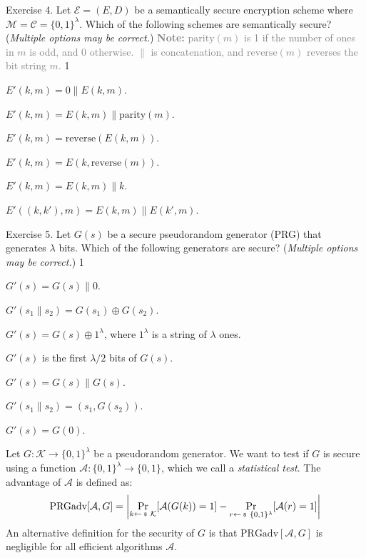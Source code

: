 \documentclass[../lecture-notes-148x210.tex]{subfiles}
\begin{document}
\begin{xexercise}
    {Exercise 4.}
    {Let $\mathcal{E} = (E,D)$ be a semantically secure encryption scheme where $\mathcal{M}=\mathcal{C}=\{0,1\}^{\lambda}$. Which of the following schemes are semantically secure? (\textit{Multiple options may be correct.})
    \newline
    \textcolor{gray}{\textbf{Note:} $\text{parity}(m)$ is 1 if the number of ones in $m$ is odd, and 0 otherwise. $\parallel$ is concatenation, and $\text{reverse}(m)$ reverses the bit string $m$.}}
    {1}
    {
        \item $E'(k,m) = 0 \parallel E(k,m)$.
        \item $E'(k,m)=E(k,m) \parallel \text{parity}(m)$.
        \item $E'(k,m)=\text{reverse}(E(k,m))$.
        \item $E'(k,m)=E(k,\text{reverse}(m))$.
        \item $E'(k,m) = E(k,m) \parallel k$.
        \item $E'((k,k'),m) = E(k,m) \parallel E(k',m)$.
    }
\end{xexercise}

\begin{xexercise}
    {Exercise 5.}
    {Let $G(s)$ be a secure pseudorandom generator (PRG) that generates $\lambda$ bits. Which of the following generators are secure? (\textit{Multiple options may be correct.})}
    {1}
    {
        \item $G'(s) = G(s) \parallel 0$.
        \item $G'(s_1 \parallel s_2) = G(s_1) \oplus G(s_2)$.
        \item $G'(s) = G(s) \oplus 1^{\lambda}$, where $1^{\lambda}$ is a string of $\lambda$ ones.
        \item $G'(s)$ is the first $\lambda/2$ bits of $G(s)$.
        \item $G'(s) = G(s) \parallel G(s)$.
        \item $G'(s_1 \parallel s_2) = (s_1, G(s_2))$.
        \item $G'(s) = G(0)$.
    }
\end{xexercise}

\begin{tcolorbox}
[ colback=blue!5!white, fonttitle=\bfseries, colframe=blue!80!white,
    title=Exercises 6-8. PRG Security and Statistical Tests]
Let $G: \mathcal{K} \to \{0,1\}^{\lambda}$ be a pseudorandom generator. We want to test if $G$ is secure using a function $\mathcal{A}: \{0,1\}^{\lambda} \to \{0,1\}$, which we call a \textit{statistical test}. The advantage of $\mathcal{A}$ is defined as:
\begin{equation*}
    \text{PRGadv}[\mathcal{A},G] = \left|\underset{k \leftarrowS \mathcal{K}}{\text{Pr}}[\mathcal{A}(G(k))=1] - \underset{r \leftarrowS \{0,1\}^{\lambda}}{\text{Pr}}[\mathcal{A}(r)=1]\right|
\end{equation*}
An alternative definition for the security of $G$ is that $\text{PRGadv}[\mathcal{A},G]$ is negligible for all efficient algorithms $\mathcal{A}$.
\end{tcolorbox}
\end{document}
